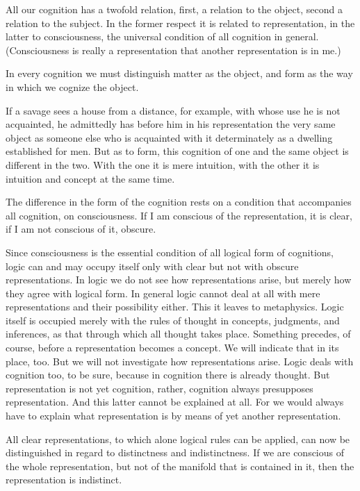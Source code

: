 All our cognition has a twofold relation,
first, a relation to the object,
second a relation to the subject.
In the former respect it is related to representation,
in the latter to consciousness,
the universal condition of all cognition in general.
(Consciousness is really a representation
that another representation is in me.)

In every cognition we must distinguish matter as the object,
and form as the way in which we cognize the object.

    If a savage sees a house from a distance, for example,
    with whose use he is not acquainted,
    he admittedly has before him in his representation
    the very same object as someone else
    who is acquainted with it determinately
    as a dwelling established for men.
    But as to form, this cognition of one and the same object
    is different in the two.
    With the one it is mere intuition,
    with the other it is intuition and concept at the same time.

The difference in the form of the cognition rests on
a condition that accompanies all cognition, on consciousness.
If I am conscious of the representation, it is clear,
if I am not conscious of it, obscure.

    Since consciousness is the essential condition of
    all logical form of cognitions,
    logic can and may occupy itself only
    with clear but not with obscure representations.
    In logic we do not see how representations arise,
    but merely how they agree with logical form.
    In general logic cannot deal at all with
    mere representations and their possibility either.
    This it leaves to metaphysics.
    Logic itself is occupied merely with the rules of thought in
    concepts, judgments, and inferences,
    as that through which all thought takes place.
    Something precedes, of course, before a representation becomes a concept.
    We will indicate that in its place, too.
    But we will not investigate how representations arise.
    Logic deals with cognition too, to be sure,
    because in cognition there is already thought.
    But representation is not yet cognition, rather,
    cognition always presupposes representation.
    And this latter cannot be explained at all.
    For we would always have to explain what representation is
    by means of yet another representation.

All clear representations, to which alone logical rules can be applied,
can now be distinguished in regard to distinctness and indistinctness.
If we are conscious of the whole representation,
but not of the manifold that is contained in it,
then the representation is indistinct.

